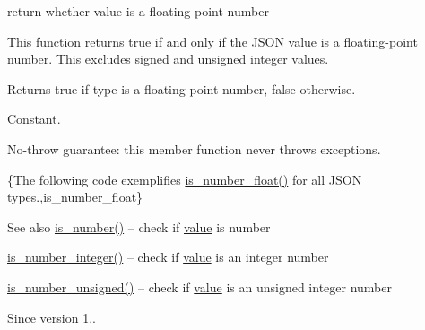 return whether value is a floating-\/point number 

This function returns true if and only if the J\+S\+ON value is a floating-\/point number. This excludes signed and unsigned integer values.

\begin{DoxyReturn}{Returns}
{\ttfamily true} if type is a floating-\/point number, {\ttfamily false} otherwise.
\end{DoxyReturn}
Constant.

No-\/throw guarantee\+: this member function never throws exceptions.

\{The following code exemplifies {\ttfamily \hyperlink{classnlohmann_1_1basic__json_a116cdb9300b56519fc9cf756609296cb}{is\+\_\+number\+\_\+float()}} for all J\+S\+ON types.,is\+\_\+number\+\_\+float\}

\begin{DoxySeeAlso}{See also}
\hyperlink{classnlohmann_1_1basic__json_abd47ac8eba63833152795280f75b5851}{is\+\_\+number()} -- check if \hyperlink{classnlohmann_1_1basic__json_ac9e014095170d72c4c57e3daf8efc059}{value} is number 

\hyperlink{classnlohmann_1_1basic__json_ac4b4acf2c0ad075c0dc125a65c102362}{is\+\_\+number\+\_\+integer()} -- check if \hyperlink{classnlohmann_1_1basic__json_ac9e014095170d72c4c57e3daf8efc059}{value} is an integer number 

\hyperlink{classnlohmann_1_1basic__json_a5493f2ed1e07b0ece428bd5a47e2fb95}{is\+\_\+number\+\_\+unsigned()} -- check if \hyperlink{classnlohmann_1_1basic__json_ac9e014095170d72c4c57e3daf8efc059}{value} is an unsigned integer number
\end{DoxySeeAlso}
\begin{DoxySince}{Since}
version 1.. 
\end{DoxySince}
